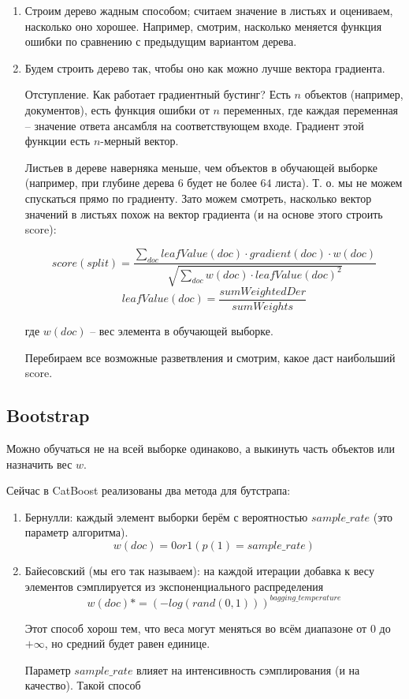 \documentclass[a4paper,12pt]{article}
\begin{document}
\begin{enumerate}[noitemsep]
    \item Строим дерево жадным способом; считаем значение в листьях и оцениваем, насколько оно хорошее.
    Например, смотрим, насколько меняется функция ошибки по сравнению с предыдущим вариантом дерева.
    \item Будем строить дерево так, чтобы оно как можно лучше вектора градиента.

    Отступление.
    Как работает градиентный бустинг?
    Есть $ n $ объектов (например, документов), есть функция ошибки от $ n $ переменных, где каждая переменная -- значение ответа ансамбля на соответствующем входе.
    Градиент этой функции есть  $ n $-мерный вектор.

    Листьев в дереве наверняка меньше, чем объектов в обучающей выборке (например, при глубине дерева $ 6 $ будет не более $ 64 $ листа).
    Т. о. мы не можем спускаться прямо по градиенту.
    Зато можем смотреть, насколько вектор значений в листьях похож на вектор градиента (и на основе этого строить score):

    $$ score(split) = \frac{\sum_{doc}leafValue(doc) \cdot gradient(doc) \cdot w(doc)}{\sqrt{\sum_{doc} w(doc) \cdot leafValue(doc)^2}} $$
    $$ leafValue(doc) = \frac{sumWeightedDer}{sumWeights} $$

    где $ w(doc) $ -- вес элемента в обучающей выборке.

    Перебираем все возможные разветвления и смотрим, какое даст наибольший score.

\end{enumerate}

\subsection{Bootstrap}

Можно обучаться не на всей выборке одинаково, а выкинуть часть объектов или назначить вес $w$.

Сейчас в CatBoost реализованы два метода для бутстрапа:

\begin{enumerate}[noitemsep]
    \item Бернулли: каждый элемент выборки берём с вероятностью $ sample\_rate $ (это параметр алгоритма).
    $$ w(doc) = 0 or 1 (p(1) = sample\_rate) $$
    \item Байесовский (мы его так называем):
    на каждой итерации добавка к весу элементов сэмплируется из экспоненциального распределения
    $$ w(doc) *= (-log(rand(0,1)))^{bagging\_temperature} $$

    Этот способ хорош тем, что веса могут меняться во всём диапазоне от $0$ до $+ \infty$, но средний будет равен единице.

    Параметр $sample\_rate$ влияет на интенсивность сэмплирования (и на качество).
    Такой способ
\end{enumerate}
\end{document}
